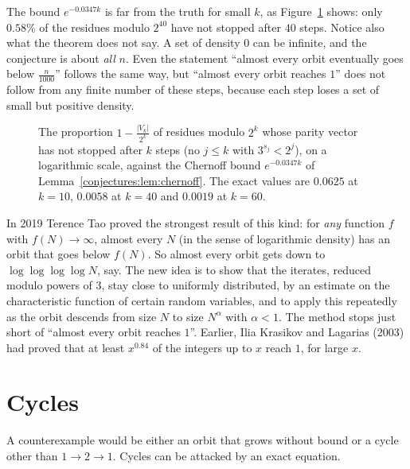 The bound $e^{-0.0347k}$ is far from the truth for small $k$, as Figure~\ref{conjectures:fig:terras} shows: only $0.58\%$ of the residues modulo $2^{40}$ have not
stopped after $40$ steps. Notice also what the theorem does not say. A set of density $0$ can be infinite, and the conjecture is about \emph{all}
$n$. Even the statement ``almost every orbit eventually goes below $\frac n{1000}$'' follows the same way, but ``almost every orbit reaches $1$'' does not
follow from any finite number of these steps, because each step loses a set of small but positive density.

\begin{figure}[ht]
\centering
{}
\caption{The proportion $1-\frac{|V_k|}{2^k}$ of residues modulo $2^k$ whose parity vector has not stopped after $k$ steps (no $j\le k$ with
$3^{s_j}<2^j$), on a logarithmic scale, against the Chernoff bound $e^{-0.0347k}$ of Lemma~\ref{conjectures:lem:chernoff}. The exact values are $0.0625$ at
$k=10$, $0.0058$ at $k=40$ and $0.0019$ at $k=60$.}
\label{conjectures:fig:terras}
\end{figure}

\begin{remark}\label{conjectures:rem:tao}
In 2019 Terence Tao proved the strongest result of this kind: for \emph{any} function $f$ with $f(N)\to\infty$, almost every $N$ (in the sense of
logarithmic density) has an orbit that goes below $f(N)$. So almost every orbit gets down to $\log\log\log\log N$, say. The new idea is to show that the
iterates, reduced modulo powers of $3$, stay close to uniformly distributed, by an estimate on the characteristic function of certain random variables,
and to apply this repeatedly as the orbit descends from size $N$ to size $N^{\alpha}$ with $\alpha<1$. The method stops just short of ``almost every orbit reaches $1$''.
Earlier, Ilia Krasikov and Lagarias (2003) had proved that at least $x^{0.84}$ of the integers up to $x$ reach $1$, for large $x$.
\end{remark}

\section{Cycles}

A counterexample would be either an orbit that grows without bound or a cycle other than $1\to2\to1$. Cycles can be attacked by an exact equation.

